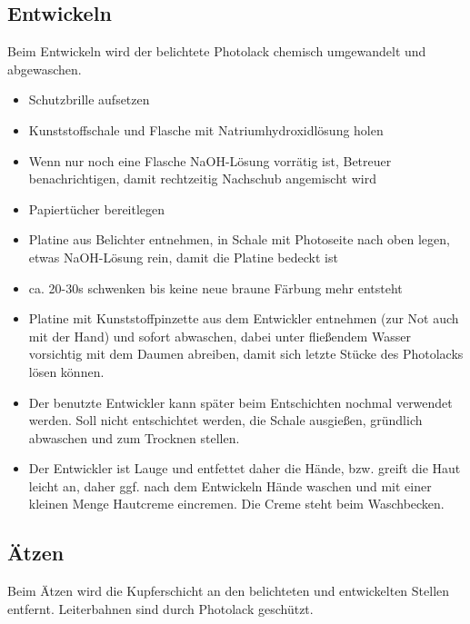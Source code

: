 \documentclass{\basedir/fablab-document}
\begin{document}
\subsection{Entwickeln}
\label{sec:entwickeln}
Beim Entwickeln wird der belichtete Photolack chemisch umgewandelt und abgewaschen.

\begin{itemize}
\item Schutzbrille aufsetzen
\item Kunststoffschale und Flasche mit Natriumhydroxidlösung holen
\item Wenn nur noch eine Flasche NaOH-Lösung vorrätig ist, Betreuer benachrichtigen, damit rechtzeitig Nachschub angemischt wird
\item Papiertücher bereitlegen
\item Platine aus Belichter entnehmen, in Schale mit Photoseite nach oben legen, etwas NaOH-Lösung rein, damit die Platine bedeckt ist
\item ca. 20-30s schwenken bis keine neue braune Färbung mehr entsteht
\item Platine mit Kunststoffpinzette aus dem Entwickler entnehmen (zur Not auch mit der Hand) und sofort abwaschen, dabei unter fließendem Wasser vorsichtig mit dem Daumen abreiben, damit sich letzte Stücke des Photolacks lösen können.
\item Der benutzte Entwickler kann später beim Entschichten nochmal verwendet werden. Soll nicht entschichtet werden, die Schale ausgießen, gründlich abwaschen und zum Trocknen stellen.
\item Der Entwickler ist Lauge und entfettet daher die Hände, bzw. greift die Haut leicht an, daher ggf. nach dem Entwickeln Hände waschen und mit einer kleinen Menge Hautcreme eincremen. Die Creme steht beim Waschbecken.
\end{itemize}

\subsection{Ätzen}
\label{sec:aetzen}
Beim Ätzen wird die Kupferschicht an den belichteten und entwickelten Stellen entfernt. Leiterbahnen sind durch Photolack geschützt.
\end{document}
